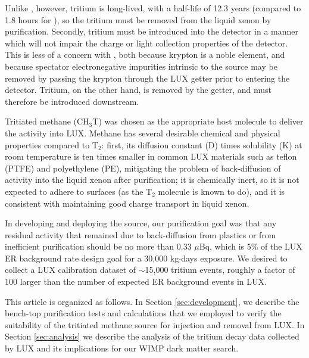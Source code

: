 Unlike \krsrc, however, tritium is long-lived, with a half-life of 12.3 years (compared to 1.8 hours for \krsrc), so the tritium must be removed from the liquid xenon by purification. Secondly, tritium must be introduced into the detector in a manner which will not impair the charge or light collection properties of the detector. This is less of a concern with \krsrc, both because krypton is a noble element, and because spectator electronegative impurities intrinsic to the source may be removed by passing the krypton through the LUX getter prior to entering the detector. Tritium, on the other hand, is removed by the getter, and must therefore be introduced downstream.

Tritiated methane (CH$_3$T) was chosen as the appropriate host molecule to deliver the activity into LUX. Methane has several desirable chemical and physical properties compared to T$_2$: first, its diffusion constant (D) times solubility (K) at room temperature is ten times smaller in common LUX materials such as teflon (PTFE) and polyethylene (PE)\cite{miyake:1983}, mitigating the problem of back-diffusion of activity into the liquid xenon after purification; it is chemically inert, so it is not expected to adhere to surfaces (as the T$_2$ molecule is known to do), and it is consistent with maintaining good charge transport in liquid xenon.

In developing and deploying the source, our purification goal was that any residual activity that remained due to back-diffusion from plastics or from inefficient purification should be no more than 0.33 $\mu$Bq, which is 5\% of the LUX ER background rate design goal for a 30,000 kg$\cdot$days exposure. We desired to collect a LUX calibration dataset of $\sim$15,000 tritium events, roughly a factor of 100 larger than the number of expected ER background events in LUX. 

This article is organized as follows. In Section \ref{sec:development}, we describe the bench-top purification tests and calculations that we employed to verify the suitability of the tritiated methane source for injection and removal from LUX. In Section \ref{sec:analysis} we describe the analysis of the tritium decay data collected by LUX and its implications for our WIMP dark matter search.



